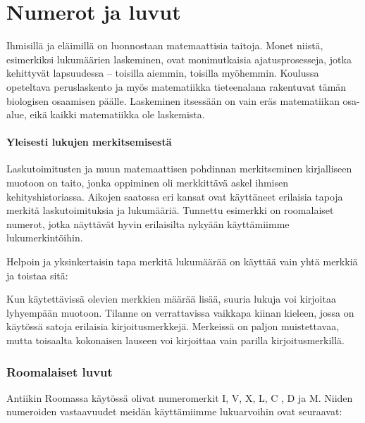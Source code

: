 \chapter{Numerot ja luvut}

Ihmisillä ja eläimillä on luonnostaan matemaattisia taitoja. Monet niistä, esimerkiksi lukumäärien laskeminen, ovat monimutkaisia ajatusprosesseja, jotka kehittyvät lapsuudessa – toisilla aiemmin, toisilla myöhemmin. Koulussa opeteltava peruslaskento ja myös matematiikka tieteenalana rakentuvat tämän biologisen osaamisen päälle. Laskeminen itsessään on vain eräs matematiikan osa-alue, eikä kaikki matematiikka ole laskemista.


\subsubsection*{Yleisesti lukujen merkitsemisestä}

Laskutoimitusten ja muun matemaattisen pohdinnan merkitseminen kirjalliseen muotoon on taito, jonka oppiminen oli merkkittävä askel ihmisen kehityshistoriassa. Aikojen saatossa eri kansat ovat käyttäneet erilaisia tapoja merkitä laskutoimituksia ja lukumääriä. Tunnettu esimerkki on roomalaiset numerot, jotka näyttävät hyvin erilaisilta nykyään käyttämiimme lukumerkintöihin.

Helpoin ja yksinkertaisin tapa merkitä lukumäärää on käyttää vain yhtä merkkiä ja toistaa sitä:


Kun käytettävissä olevien merkkien määrää lisää, suuria lukuja voi kirjoitaa lyhyempään muotoon. Tilanne on verrattavissa vaikkapa kiinan kieleen, jossa on käytössä satoja erilaisia kirjoitusmerkkejä. Merkeissä on paljon muistettavaa, mutta toisaalta kokonaisen lauseen voi kirjoittaa vain parilla kirjoitusmerkillä.




\subsection*{Roomalaiset luvut}
Antiikin Roomassa käytössä olivat numeromerkit I, V, X, L, C , D ja M. Niiden numeroiden vastaavuudet meidän käyttämiimme lukuarvoihin ovat seuraavat:


